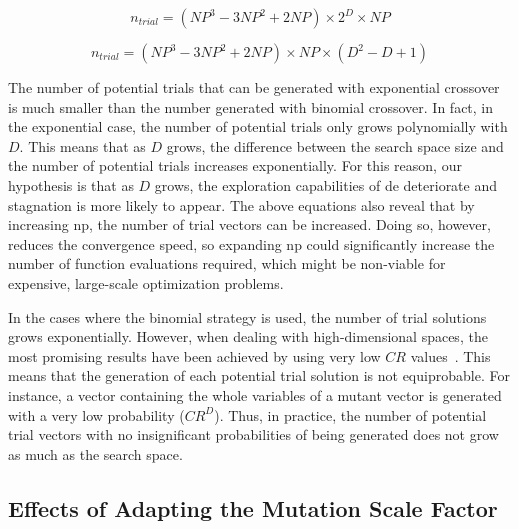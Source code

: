 \documentclass[preprint,3p]{elsarticle}
\newcommand{\DE}{{\sc de}}
\newcommand{\NP}{{\sc np}}
\begin{document}
\begin{equation}
	\label{eq:trials_bin}
		n_{trial} = (NP^3 - 3NP^2 + 2NP) \times 2^D \times NP
\end{equation}

\begin{equation}
	\label{eq:trials_exp}
		n_{trial} = (NP^3 - 3NP^2 + 2NP) \times NP \times (D^2 - D + 1)
\end{equation}

The number of potential trials that can be generated with exponential crossover is much smaller than the
number generated with binomial crossover.
%
In fact, in the exponential case, the number of potential trials only grows polynomially with $D$.
%
This means that as $D$ grows, the difference between the search space size and the number of potential
trials increases exponentially.
%
For this reason, our hypothesis is that as $D$ grows, the exploration capabilities of \DE{} deteriorate
and stagnation is more likely to appear.
%
The above equations also reveal that by increasing \NP{}, the number of trial vectors can be increased.
%
Doing so, however, reduces the convergence speed, so expanding \NP{} could significantly increase the number
of function evaluations required, which might be non-viable for expensive, large-scale optimization problems.

In the cases where the binomial strategy is used, the number of trial solutions grows exponentially.
%
However, when dealing with high-dimensional spaces, the most promising results have been
achieved by using very low $CR$ values~\cite{Olguin:13}.
%
This means that the generation of each potential trial solution is not equiprobable.
%
For instance, a vector containing the whole variables of a mutant vector is generated with a very low
probability ($CR^D$).
%
Thus, in practice, the number of potential trial vectors with no insignificant
probabilities of being generated does not grow as much as the search space.

\subsection{Effects of Adapting the Mutation Scale Factor}
\end{document}
